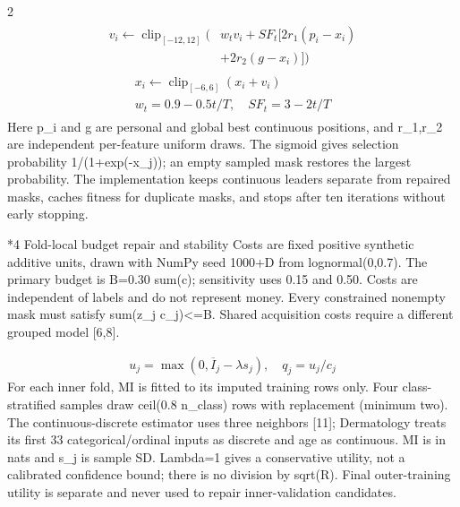 \documentclass[10pt,a4paper]{article}
\makeatletter
\renewcommand{\section}{\@startsection{section}{1}{0pt}{5pt}{2pt}{\normalfont\normalsize\bfseries}}
\newcommand{\sect}[1]{\section*{#1}}
\makeatother
\begin{document}
\begin{multicols}{2}
\begin{equation}\begin{gathered}\begin{aligned}v_i\leftarrow\operatorname{clip}_{[-12,12]}\big(&w_t v_i+SF_t[2r_1(p_i-x_i)\\&+2r_2(g-x_i)]\big)\end{aligned}\end{gathered}\end{equation}
\begin{equation}\begin{gathered}\begin{gathered}x_i\leftarrow\operatorname{clip}_{[-6,6]}(x_i+v_i)\\w_t=0.9-0.5t/T,\quad SF_t=3-2t/T\end{gathered}\end{gathered}\end{equation}
Here p\_i and g are personal and global best continuous positions, and r\_1,r\_2 are independent per-feature uniform draws. The sigmoid gives selection probability 1/(1+exp(-x\_j)); an empty sampled mask restores the largest probability. The implementation keeps continuous leaders separate from repaired masks, caches fitness for duplicate masks, and stops after ten iterations without early stopping.

\sect{4  Fold-local budget repair and stability}
Costs are fixed positive synthetic additive units, drawn with NumPy seed 1000+D from lognormal(0,0.7). The primary budget is B=0.30 sum(c); sensitivity uses 0.15 and 0.50. Costs are independent of labels and do not represent money. Every constrained nonempty mask must satisfy sum(z\_j c\_j)<=B. Shared acquisition costs require a different grouped model [6,8].

\begin{equation}\begin{gathered}u_j=\max(0,\overline I_j-\lambda s_j),\quad q_j=u_j/c_j\end{gathered}\end{equation}
For each inner fold, MI is fitted to its imputed training rows only. Four class-stratified samples draw ceil(0.8 n\_class) rows with replacement (minimum two). The continuous-discrete estimator uses three neighbors [11]; Dermatology treats its first 33 categorical/ordinal inputs as discrete and age as continuous. MI is in nats and s\_j is sample SD. Lambda=1 gives a conservative utility, not a calibrated confidence bound; there is no division by sqrt(R). Final outer-training utility is separate and never used to repair inner-validation candidates.


\end{multicols}
\end{document}
